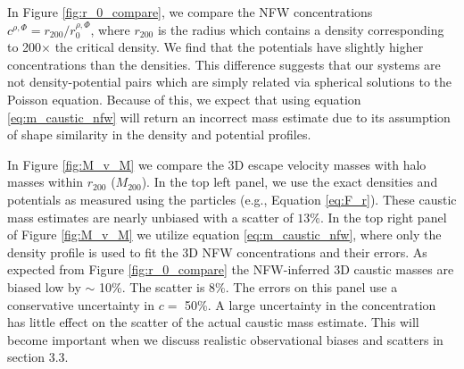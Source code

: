 \documentclass[iop]{emulateapj}
\begin{document}
    In Figure \ref{fig:r_0_compare}, we compare the NFW concentrations $c^{\rho,\Phi} = r_{200}/r_0^{\rho,\Phi}$, where $r_{200}$ is the radius which contains a density corresponding to 200$\times$ the critical density. We find that the potentials have slightly higher concentrations than the densities. This difference suggests that our systems are not density-potential pairs which are simply related via spherical solutions to the Poisson equation. Because of this, we expect that using equation \ref{eq:m_caustic_nfw} will return an incorrect mass estimate due to its assumption of shape similarity in the density and potential profiles.
    
    \begin{figure*}
    \caption{{\bf Top Left:} $M_{200}$ vs the 3D caustic mass estimated inside $r_{200}$ calculated using the exact potential and density profiles (see equation \ref{eq:F_r}). {\bf Top Right:} Caustic masses using NFW fits to the 3D density profiles (equation \ref{eq:m_caustic_nfw}).  The induced bias is expected from Figure \ref{fig:r_0_compare}. In all panels the solid blue line is unity and the green dashed line represents the average bias of the sample with slope unity. {\bf Bottom Left:} $M_{200}$ vs the line-of-sight caustic mass estimated inside a projected $r_{200}$. As in the top panel, we use the particle potential and density profiles, but now include the particle anisotropy profiles as well. The increased scatter is due to the line-of-sight projections which induce scatter into the velocity dispersions. {\bf Bottom Right:} Projected caustic masses based on an NFW density profile with a single sample concentration of $\langle c \rangle = 5 \pm 2$ and a single sample $\langle \beta \rangle = 0.2 \pm 0.2$. These large uncertainties do not add appreciably to the scatter induced by the line-of-sight projection effects. Mass biases induced by systematic errors in $\beta$ are shown by the two dotted lines $\langle \beta \rangle = 0.0$ (lower) or $\langle \beta \rangle = 0.4$ (upper).}
    \label{fig:M_v_M}
    \end{figure*}

    In Figure \ref{fig:M_v_M} we compare the 3D escape velocity masses with halo masses within $r_{200}$ ($M_{200}$). In the top left panel, we use the exact densities and potentials as measured using the particles (e.g., Equation \ref{eq:F_r}). These caustic mass estimates are nearly unbiased with a scatter of $13\%$. In the top right panel of Figure \ref{fig:M_v_M} we utilize equation \ref{eq:m_caustic_nfw}, where only the density profile is used to fit the 3D NFW concentrations and their errors. As expected from Figure  \ref{fig:r_0_compare} the NFW-inferred 3D caustic masses are biased low by $\sim$ 10\%. The scatter is 8\%. The errors on this panel use a conservative uncertainty in $c =$ 50\%. A large uncertainty in the concentration has little effect on the scatter of the actual caustic mass estimate. This will become important when we discuss realistic observational biases and scatters in section 3.3.
\end{document}

